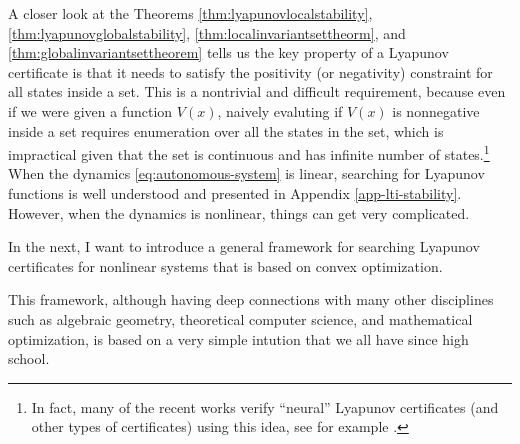 \documentclass[
]{book}
\theoremstyle{definition}
\theoremstyle{definition}
\theoremstyle{definition}
\theoremstyle{definition}
\theoremstyle{remark}
\begin{document}
A closer look at the Theorems \ref{thm:lyapunovlocalstability}, \ref{thm:lyapunovglobalstability}, \ref{thm:localinvariantsettheorm}, and \ref{thm:globalinvariantsettheorem} tells us the key property of a Lyapunov certificate is that it needs to satisfy the positivity (or negativity) constraint for all states inside a set. This is a nontrivial and difficult requirement, because even if we were given a function \(V(x)\), naively evaluting if \(V(x)\) is nonnegative inside a set requires enumeration over all the states in the set, which is impractical given that the set is continuous and has infinite number of states.\footnote{In fact, many of the recent works verify ``neural'' Lyapunov certificates (and other types of certificates) using this idea, see for example \citep{dawson23tro-safe}.} When the dynamics \eqref{eq:autonomous-system} is linear, searching for Lyapunov functions is well understood and presented in Appendix \ref{app-lti-stability}. However, when the dynamics is nonlinear, things can get very complicated.

In the next, I want to introduce a general framework for searching Lyapunov certificates for nonlinear systems that is based on convex optimization.

This framework, although having deep connections with many other disciplines such as algebraic geometry, theoretical computer science, and mathematical optimization, is based on a very simple intution that we all have since high school.
\end{document}
